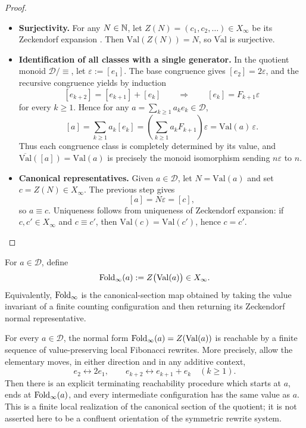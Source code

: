 \begin{proof}
\begin{itemize}
  \item \textbf{Surjectivity.} For any \(N\in\mathbb{N}\), let \(Z(N)=(c_1,c_2,\dots)\in X_\infty\) be its Zeckendorf expansion \cite{Zeckendorf1972}. Then \(\mathrm{Val}(Z(N))=N\), so \(\overline{\mathrm{Val}}\) is surjective.
  \item \textbf{Identification of all classes with a single generator.} In the quotient monoid \(\mathcal{D}/\!\equiv\), let \(\varepsilon:=[e_1]\). The base congruence gives \([e_2]=2\varepsilon\), and the recursive congruence yields by induction
\[
[e_{k+2}]=[e_{k+1}]+[e_k]
\qquad\Longrightarrow\qquad
[e_k]=F_{k+1}\varepsilon
\]
for every \(k\ge 1\). Hence for any \(a=\sum_{k\ge 1} a_k e_k\in\mathcal{D}\),
\[
[a]=\sum_{k\ge 1} a_k [e_k]
=\left(\sum_{k\ge 1} a_k F_{k+1}\right)\varepsilon
=\mathrm{Val}(a)\,\varepsilon.
\]
Thus each congruence class is completely determined by its value, and \(\overline{\mathrm{Val}}([a])=\mathrm{Val}(a)\) is precisely the monoid isomorphism sending \(n\varepsilon\) to \(n\).
  \item \textbf{Canonical representatives.} Given \(a\in\mathcal{D}\), let \(N=\mathrm{Val}(a)\) and set \(c=Z(N)\in X_\infty\). The previous step gives
\[
[a]=N\varepsilon=[c],
\]
so \(a\equiv c\). Uniqueness follows from uniqueness of Zeckendorf expansion: if \(c,c'\in X_\infty\) and \(c\equiv c'\), then \(\mathrm{Val}(c)=\mathrm{Val}(c')\), hence \(c=c'\).
\end{itemize}
\end{proof}

\begin{definition}\label{def:stable-fold}
For \(a\in\mathcal{D}\), define
\[
\operatorname{Fold}_\infty(a):=Z\bigl(\mathrm{Val}(a)\bigr)\in X_\infty.
\]
Equivalently, \(\operatorname{Fold}_\infty\) is the canonical-section map obtained by taking the value invariant of a finite counting configuration and then returning its Zeckendorf normal representative.
\end{definition}

\begin{proposition}\label{prop:finite-local-fold-normalization}
For every \(a\in\mathcal{D}\), the normal form \(\operatorname{Fold}_\infty(a)
=Z(\mathrm{Val}(a))\) is reachable by a finite sequence of value-preserving local Fibonacci rewrites. More precisely, allow the elementary moves, in either direction and in any additive context,
\[
e_2\longleftrightarrow 2e_1,
\qquad
e_{k+2}\longleftrightarrow e_{k+1}+e_k\quad(k\ge 1).
\]
Then there is an explicit terminating reachability procedure which starts at \(a\), ends at \(\operatorname{Fold}_\infty(a)\), and every intermediate configuration has the same value as \(a\). This is a finite local realization of the canonical section of the quotient; it is not asserted here to be a confluent orientation of the symmetric rewrite system.
\end{proposition}

